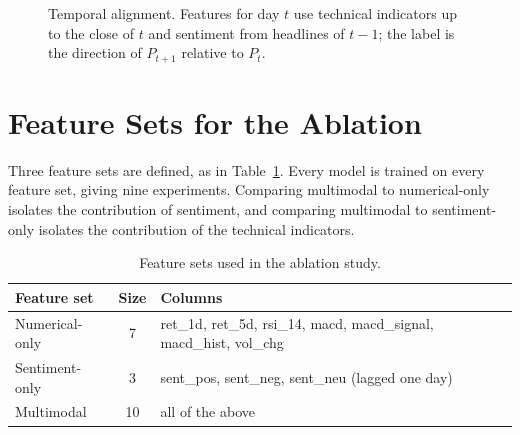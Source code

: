 \begin{figure}[!htbp]
\centering
{}
\caption{Temporal alignment. Features for day $t$ use technical indicators up to the close of $t$ and sentiment from headlines of $t-1$; the label is the direction of $P_{t+1}$ relative to $P_t$.}
\label{fig:timeline}
\end{figure}

\section{Feature Sets for the Ablation}
Three feature sets are defined, as in Table~\ref{tab:featuresets}. Every model is trained on every feature set, giving nine experiments. Comparing multimodal to numerical-only isolates the contribution of sentiment, and comparing multimodal to sentiment-only isolates the contribution of the technical indicators.

\begin{table}[!htbp]
\centering
\small
\begin{tabularx}{\textwidth}{@{}l c X@{}}
\toprule
Feature set & Size & Columns \\
\midrule
Numerical-only & 7 & ret\_1d, ret\_5d, rsi\_14, macd, macd\_signal, macd\_hist, vol\_chg \\
Sentiment-only & 3 & sent\_pos, sent\_neg, sent\_neu (lagged one day) \\
Multimodal & 10 & all of the above \\
\bottomrule
\end{tabularx}
\caption{Feature sets used in the ablation study.}
\label{tab:featuresets}
\end{table}

